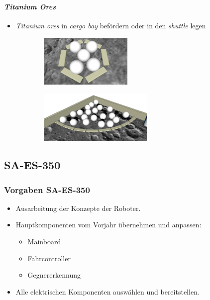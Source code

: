 \begin{frame}
\end{frame}

\begin{frame}
	\frametitle{\eurobot}
	\framesubtitle{\textit{Titanium Ores}}
	
	\begin{itemize}
		\item \textit{Titanium ores} in \textit{cargo bay} befördern oder in den \textit{shuttle} legen
	\end{itemize}
	
	\begin{figure}
		\begin{subfigure}{0.4\textwidth}
			\includegraphics[height=2.5cm]{../images/craterSmall.jpg}
		\end{subfigure}
		\hspace{1em}
		\begin{subfigure}{0.4\textwidth}
			\includegraphics[height=2.5cm]{../images/craterBig.jpg}
		\end{subfigure}
	\end{figure}
	
\end{frame}


\subsection{SA-ES-350}
\begin{frame}
	\frametitle{Vorgaben SA-ES-350}
	
	\begin{itemize}
		\item Ausarbeitung der Konzepte der Roboter.
		\item Hauptkomponenten vom Vorjahr übernehmen und anpassen:
		\begin{itemize}
			\item Mainboard%
			\item Fahrcontroller%
			\item Gegnererkennung%
		\end{itemize}
		
		\item Alle elektrischen Komponenten auswählen und bereitstellen.
	\end{itemize}

\end{frame}  
